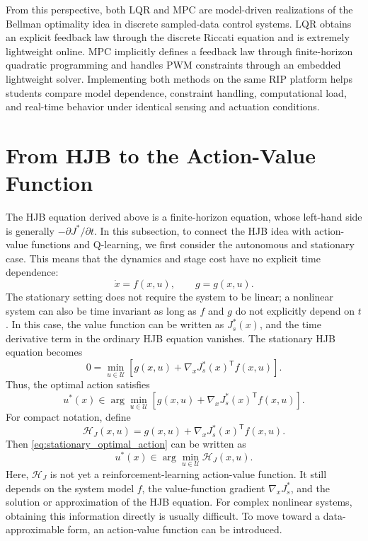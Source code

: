 \documentclass[11pt]{article}
\begin{document}
From this perspective, both LQR and MPC are model-driven realizations of the Bellman optimality idea in discrete sampled-data control systems. LQR obtains an explicit feedback law through the discrete Riccati equation and is extremely lightweight online. MPC implicitly defines a feedback law through finite-horizon quadratic programming and handles PWM constraints through an embedded lightweight solver. Implementing both methods on the same RIP platform helps students compare model dependence, constraint handling, computational load, and real-time behavior under identical sensing and actuation conditions.

\section{From HJB to the Action-Value Function}

The HJB equation derived above is a finite-horizon equation, whose left-hand side is generally $-\partial J^{*}/\partial t$. In this subsection, to connect the HJB idea with action-value functions and Q-learning, we first consider the autonomous and stationary case. This means that the dynamics and stage cost have no explicit time dependence:
\begin{equation}
\dot{x}=f(x,u),
\qquad g=g(x,u).
\label{eq:stationary_dynamics}
\end{equation}
The stationary setting does not require the system to be linear; a nonlinear system can also be time invariant as long as $f$ and $g$ do not explicitly depend on $t$. In this case, the value function can be written as $J_s^{*}(x)$, and the time derivative term in the ordinary HJB equation vanishes. The stationary HJB equation becomes
\begin{equation}
0=
\min_{u\in\mathcal{U}}
\left[
 g(x,u)+\nabla_xJ_s^{*}(x)^{\mathsf T}f(x,u)
\right].
\label{eq:stationary_hjb}
\end{equation}
Thus, the optimal action satisfies
\begin{equation}
u^{*}(x)\in
\arg\min_{u\in\mathcal{U}}
\left[
 g(x,u)+\nabla_xJ_s^{*}(x)^{\mathsf T}f(x,u)
\right].
\label{eq:stationary_optimal_action}
\end{equation}
For compact notation, define
\begin{equation}
\mathcal{H}_J(x,u)
=g(x,u)+\nabla_xJ_s^{*}(x)^{\mathsf T}f(x,u).
\label{eq:HJ_def}
\end{equation}
Then \eqref{eq:stationary_optimal_action} can be written as
\begin{equation}
u^{*}(x)\in
\arg\min_{u\in\mathcal{U}}\mathcal{H}_J(x,u).
\label{eq:HJ_argmin}
\end{equation}
Here, $\mathcal{H}_J$ is not yet a reinforcement-learning action-value function. It still depends on the system model $f$, the value-function gradient $\nabla_xJ_s^{*}$, and the solution or approximation of the HJB equation. For complex nonlinear systems, obtaining this information directly is usually difficult. To move toward a data-approximable form, an action-value function can be introduced.
\end{document}
